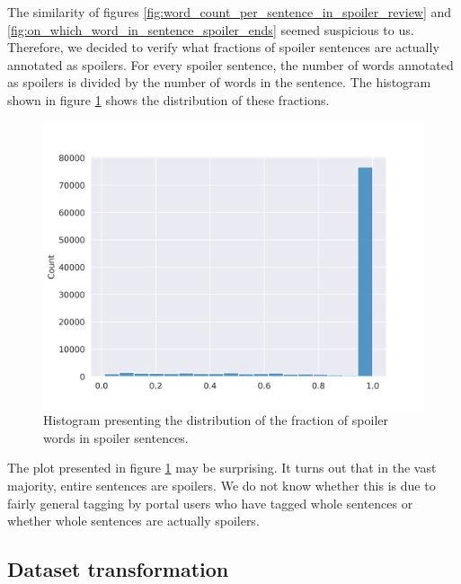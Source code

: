 \documentclass[11pt]{article}
\begin{document}
The similarity of figures \ref{fig:word_count_per_sentence_in_spoiler_review} and \ref{fig:on_which_word_in_sentence_spoiler_ends} seemed suspicious to us. Therefore, we decided to verify what fractions of spoiler sentences are actually annotated as spoilers. For every spoiler sentence, the number of words annotated as spoilers is divided by the number of words in the sentence. The histogram shown in figure \ref{fig:how_much_of_spoiler_is_in_spoiler_sentence} shows the distribution of these fractions.

\begin{figure}
    \centering
    \includegraphics[width=\columnwidth]{img/eda/how_much_of_spoiler_is_in_spoiler_sentence.png}
    \caption{Histogram presenting the distribution of the fraction of spoiler words in spoiler sentences.} 
    \label{fig:how_much_of_spoiler_is_in_spoiler_sentence}
\end{figure}

The plot presented in figure \ref{fig:how_much_of_spoiler_is_in_spoiler_sentence} may be surprising. It turns out that in the vast majority, entire sentences are spoilers. We do not know whether this is due to fairly general tagging by portal users who have tagged whole sentences or whether whole sentences are actually spoilers.

\subsection{Dataset transformation}
\end{document}
